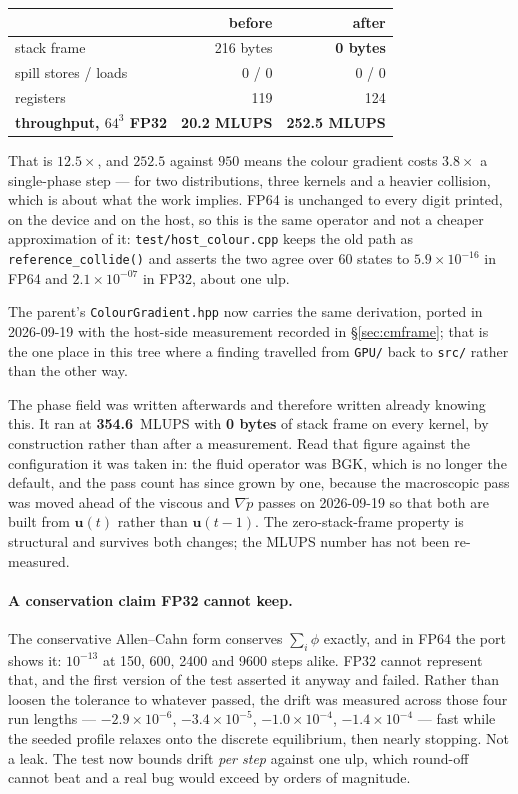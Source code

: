 \documentclass[11pt,a4paper]{article}
\newcommand{\code}[1]{\texttt{\small #1}}
\newcommand{\uu}{\bm{u}}
\newcommand{\e}[1]{\times 10^{#1}}
\begin{document}
\begin{center}
\begin{tabular}{lrr}
\toprule
 & before & after \\
\midrule
stack frame & 216 bytes & \textbf{0 bytes} \\
spill stores / loads & 0 / 0 & 0 / 0 \\
registers & 119 & 124 \\
\textbf{throughput, $64^3$ FP32} & \textbf{20.2 MLUPS} & \textbf{252.5 MLUPS} \\
\bottomrule
\end{tabular}
\end{center}

That is $12.5\times$, and $252.5$ against $950$ means the colour gradient costs
$3.8\times$ a single-phase step --- for two distributions, three kernels and a
heavier collision, which is about what the work implies. FP64 is unchanged to
every digit printed, on the device and on the host, so this is the same operator
and not a cheaper approximation of it: \code{test/host\_colour.cpp} keeps the old
path as \code{reference\_collide()} and asserts the two agree over 60 states to
$5.9\e{-16}$ in FP64 and $2.1\e{-07}$ in FP32, about one ulp.

The parent's \code{ColourGradient.hpp} now carries the same derivation, ported
in 2026-09-19 with the host-side measurement recorded in \S\ref{sec:cmframe};
that is the one place in this tree where a finding travelled from \code{GPU/}
back to \code{src/} rather than the other way.

The phase field was written afterwards and therefore written already knowing
this. It ran at \textbf{354.6}~MLUPS with \textbf{0 bytes} of stack frame on
every kernel, by construction rather than after a measurement. Read that figure
against the configuration it was taken in: the fluid operator was BGK, which is
no longer the default, and the pass count has since grown by one, because the
macroscopic pass was moved ahead of the viscous and $\nabla\tilde p$ passes on
2026-09-19 so that both are built from $\uu(t)$ rather than $\uu(t-1)$. The
zero-stack-frame property is structural and survives both changes; the MLUPS
number has not been re-measured.

\paragraph{A conservation claim FP32 cannot keep.} The conservative
Allen--Cahn form conserves $\sum_i \phi$ exactly, and in FP64 the port shows it:
$10^{-13}$ at 150, 600, 2400 and 9600 steps alike. FP32 cannot represent that,
and the first version of the test asserted it anyway and failed. Rather than
loosen the tolerance to whatever passed, the drift was measured across those
four run lengths --- $-2.9\e{-6}$, $-3.4\e{-5}$, $-1.0\e{-4}$, $-1.4\e{-4}$ ---
fast while the seeded profile relaxes onto the discrete equilibrium, then nearly
stopping. Not a leak. The test now bounds drift \emph{per step} against one ulp,
which round-off cannot beat and a real bug would exceed by orders of magnitude.
\end{document}
